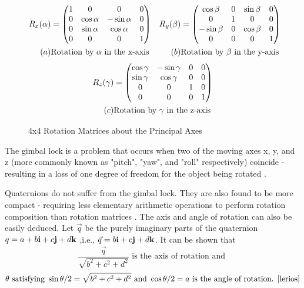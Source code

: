 \begin{figure}[h]
	\begin{align*}
			{R}_{x}{(\alpha)} &=
			\begin{pmatrix}
				1 & 0 & 0 & 0 \\
				0 & \cos{\alpha} & -\sin{\alpha} & 0 \\
				0 & \sin{\alpha} & \cos{\alpha} & 0 \\
				0 & 0 & 0 & 1
			\end{pmatrix}
			&
			{R}_{y}{(\beta)} &=
			\begin{pmatrix}
				\cos{\beta} & 0 & \sin{\beta} & 0 \\
				0 & 1 & 0 & 0 \\
				-\sin{\beta} & 0 & \cos{\beta} & 0 \\
				0 & 0 & 0 & 1
			\end{pmatrix} \\
			(a) & \text{Rotation by $\alpha$ in the x-axis} 
			& 
			(b) & \text{Rotation by $\beta$ in the y-axis}	
	 \end{align*} 
		 \begin{align*}
			{R}_{z}{(\gamma)} &=
			\begin{pmatrix}
				\cos{\gamma} & -\sin{\gamma} & 0 & 0 \\
				\sin{\gamma} & \cos{\gamma} &  0 & 0 \\
				0 & 0 & 1 & 0 \\
				0 & 0 & 0 & 1
		 \end{pmatrix} \\
		 (c) & \text{Rotation by $\gamma$ in the z-axis}	
		\end{align*}
		\caption{4x4 Rotation Matrices about the Principal Axes}
		\label{4x4}
\end{figure}

\noindent The gimbal lock is a problem that occurs when two of the moving axes x, y, and z (more commonly known as "pitch", "yaw", and "roll" respectively) coincide - resulting in a loss of one degree of freedom for the object being rotated \cite{jia}. 

Quaternions do not suffer from the gimbal lock. They are also found to be more compact - requiring less elementary arithmetic operations to perform rotation composition than rotation matrices \cite{lerios}. The axis and angle of rotation can also be easily deduced. Let $\vec{q}$ be the purely imaginary parts of the quaternion $q = a + b\textbf{i} + c\textbf{j} + d\textbf{k} $ ,i.e., $\vec{q} = b\textbf{i} + c\textbf{j} + d\textbf{k}$. It can be shown that $$\frac{\vec{q}}{\sqrt{b^2+c^2+d^2}} \text{ is the axis of rotation and }$$ $$\theta \text{ satisfying } \sin{\theta/2} = \sqrt{b^2+c^2+d^2} \text{ and } \cos{\theta/2} = a \text{ is the angle of rotation. \cite{lerios}}$$

